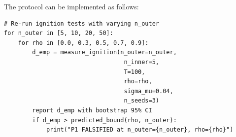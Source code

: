 The protocol can be implemented as follows:
\begin{verbatim}
# Re-run ignition tests with varying n_outer
for n_outer in [5, 10, 20, 50]:
    for rho in [0.0, 0.3, 0.5, 0.7, 0.9]:
        d_emp = measure_ignition(n_outer=n_outer,
                                  n_inner=5,
                                  T=100,
                                  rho=rho,
                                  sigma_mu=0.04,
                                  n_seeds=3)
        report d_emp with bootstrap 95% CI
        if d_emp > predicted_bound(rho, n_outer):
            print("P1 FALSIFIED at n_outer={n_outer}, rho={rho}")
\end{verbatim}
